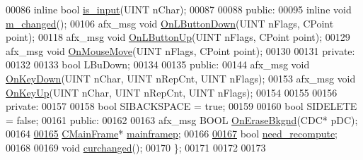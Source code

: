 \begin{DoxyCode}
00086   \textcolor{keyword}{inline} \textcolor{keywordtype}{bool} \hyperlink{class_c_child_view_a32656902f423e5c809ca20f3013fc107}{is\_input}(UINT nChar);
00087 
00088  \textcolor{keyword}{public}:
00095   \textcolor{keyword}{inline} \textcolor{keywordtype}{void} \hyperlink{class_c_child_view_acff91e8fc8cc40cd1ebe1d24a6be4945}{m\_changed}();
00106   afx\_msg \textcolor{keywordtype}{void} \hyperlink{class_c_child_view_af513a57c45ce8b9dcc09dd934e228534}{OnLButtonDown}(UINT nFlags, CPoint point);
00118   afx\_msg \textcolor{keywordtype}{void} \hyperlink{class_c_child_view_ae81948a77ebf3744bd0f9449af57ee21}{OnLButtonUp}(UINT nFlags, CPoint point);
00129   afx\_msg \textcolor{keywordtype}{void} \hyperlink{class_c_child_view_ad3cb2f8d9fa9a6fb06989513dee5a8bc}{OnMouseMove}(UINT nFlags, CPoint point);
00130 
00131  \textcolor{keyword}{private}:
00132   
00133   \textcolor{keywordtype}{bool} LBuDown;
00134 
00135  \textcolor{keyword}{public}:
00144   afx\_msg \textcolor{keywordtype}{void} \hyperlink{class_c_child_view_a74d87512b76128e2eedea87811363e45}{OnKeyDown}(UINT nChar, UINT nRepCnt, UINT nFlags);
00153   afx\_msg \textcolor{keywordtype}{void} \hyperlink{class_c_child_view_afec062448272d8f1e15bcedcb8765abe}{OnKeyUp}(UINT nChar, UINT nRepCnt, UINT nFlags);
00154 
00155 
00156   \textcolor{keyword}{private}:
00157      
00158       \textcolor{keywordtype}{bool} SIBACKSPACE = \textcolor{keyword}{true}; 
00159       
00160       \textcolor{keywordtype}{bool} SIDELETE = \textcolor{keyword}{false};
00161 \textcolor{keyword}{public}:
00162     
00163     afx\_msg BOOL \hyperlink{class_c_child_view_a6060e6d09d522d345dcee5a01d41c1f0}{OnEraseBkgnd}(CDC* pDC);
00164     
\hyperlink{class_c_child_view_a5c52f5e75191a707906b1334f0281376}{00165}     \hyperlink{class_c_main_frame}{CMainFrame}* \hyperlink{class_c_child_view_a5c52f5e75191a707906b1334f0281376}{mainframep};
00166   
\hyperlink{class_c_child_view_a7a2763ed4f49e10e4efc2c89fdf3bbbf}{00167}     \textcolor{keywordtype}{bool} \hyperlink{class_c_child_view_a7a2763ed4f49e10e4efc2c89fdf3bbbf}{need\_recompute};
00168 
00169     \textcolor{keywordtype}{void} \hyperlink{class_c_child_view_ab68bf2b03a8e9aab3f2aac2b9ec3177a}{curchanged}();
00170 \};
00171 
00172 
00173 
\end{DoxyCode}
